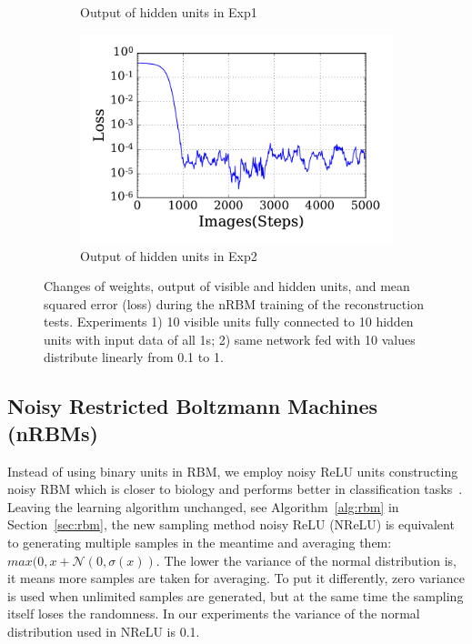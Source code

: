 \begin{figure}
\begin{subfigure}[t]{0.4\textwidth}
		\caption{Output of hidden units in Exp1}
	\end{subfigure}
	\begin{subfigure}[t]{0.4\textwidth}
		\includegraphics[width=\textwidth]{pics_sdlm/30_exp_RBM/exp2_loss.pdf}
		\caption{Output of hidden units in Exp2}
	\end{subfigure}
	\caption{Changes of weights, output of visible and hidden units, and mean squared error (loss) during the nRBM training of the reconstruction tests. 
		Experiments 1) 10 visible units fully connected to 10 hidden units with input data of all 1s; 2) same network fed with 10 values distribute linearly from 0.1 to 1.}
	\label{fig:rbm_orig}
\end{figure}

\subsection{Noisy Restricted Boltzmann Machines (nRBMs)}
Instead of using binary units in RBM, we employ noisy ReLU units constructing noisy RBM which is closer to biology and performs better in classification tasks~\cite{nair2010rectified}.
Leaving the learning algorithm unchanged, see Algorithm~\ref{alg:rbm} in Section~\ref{sec:rbm}, the new sampling method noisy ReLU (NReLU) is equivalent to generating multiple samples in the meantime and averaging them: $max(0, x+\mathcal{N}(0, \sigma(x))$.
The lower the variance of the normal distribution is, it means more samples are taken for averaging.
To put it differently, zero variance is used when unlimited samples are generated, but at the same time the sampling itself loses the randomness.
In our experiments the variance of the normal distribution used in NReLU is 0.1.







